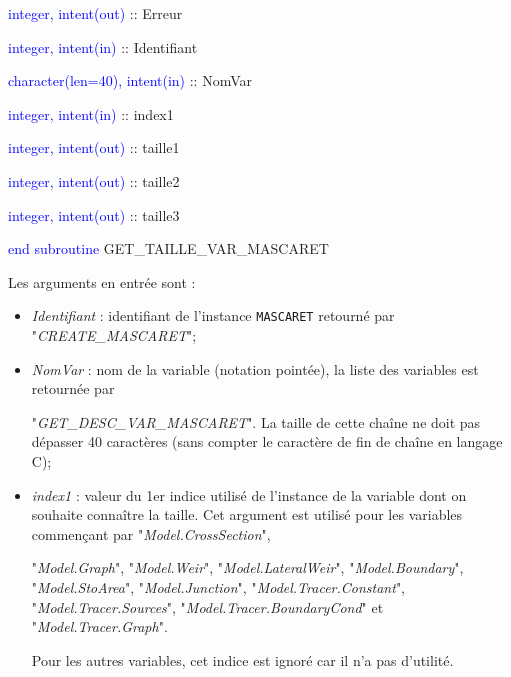 \documentclass[a4paper,11pt]{article}
\begin{document}
        \hspace{1cm} \textcolor{blue}{integer, intent(out)} :: Erreur
        
        \hspace{1cm} \textcolor{blue}{integer, intent(in)}  :: Identifiant
        
        \hspace{1cm} \textcolor{blue}{character(len=40), intent(in)}  :: NomVar
        
        \hspace{1cm} \textcolor{blue}{integer, intent(in)}  :: index1
        
        \hspace{1cm} \textcolor{blue}{integer, intent(out)}  :: taille1
        
        \hspace{1cm} \textcolor{blue}{integer, intent(out)}  :: taille2
        
        \hspace{1cm} \textcolor{blue}{integer, intent(out)}  :: taille3
        
    \textcolor{blue}{end subroutine} GET\_TAILLE\_VAR\_MASCARET
    
 \vspace{0.5cm}

 Les arguments en entr\'ee sont :
 
 \vspace{0.5cm}
 
 \begin{itemize}
 
    \item \textit{Identifiant} : identifiant de l'instance \texttt{MASCARET} retourn\'e par "\textit{CREATE\_MASCARET}";
    \vspace{0.5cm}
    \item \textit{NomVar} : nom de la variable (notation point\'ee), la liste des variables est retourn\'ee par 
    
    "\textit{GET\_DESC\_VAR\_MASCARET}". La taille de cette cha\^ine ne doit pas d\'epasser 40 caract\`eres (sans compter le caract\`ere de fin de cha\^ine en langage C);
    \vspace{0.5cm}
    \item \textit{index1} : valeur du 1er indice utilis\'e de l'instance de la variable dont on souhaite conna\^itre la taille. Cet argument est utilis\'e pour les variables commen\c{c}ant par "\textit{Model.CrossSection}",
    
    "\textit{Model.Graph}", "\textit{Model.Weir}",
      "\textit{Model.LateralWeir}", "\textit{Model.Boundary}",
      "\textit{Model.StoArea}", "\textit{Model.Junction}",
      "\textit{Model.Tracer.Constant}",
      "\textit{Model.Tracer.Sources}", "\textit{Model.Tracer.BoundaryCond}"
      et "\textit{Model.Tracer.Graph}".
    
    Pour les autres variables, cet indice est ignor\'e car il n'a pas d'utilit\'e.
 \end{itemize}
 
\end{document}
